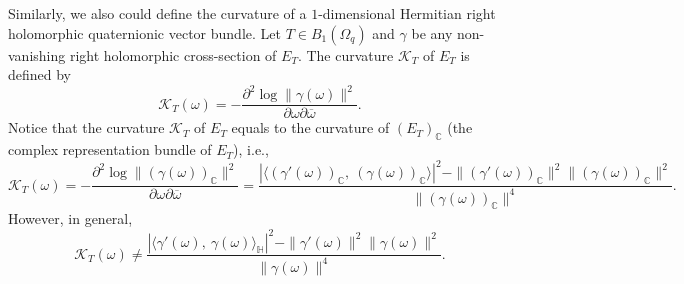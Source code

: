 \documentclass[pdflatex,sn-mathphys-num]{sn-jnl}%
\theoremstyle{thmstyleone}%
\theoremstyle{thmstyletwo}%
\theoremstyle{thmstylethree}%
\theoremstyle{definition}
\theoremstyle{remark}
\begin{document}
Similarly, we also could define the curvature of a $1$-dimensional Hermitian right holomorphic quaternionic vector bundle. Let $T\in B_1(\Omega_q)$ and $\gamma$ be any non-vanishing right holomorphic cross-section of $E_{T}$. The curvature $\mathcal{K}_T$ of $E_T$ is defined by
$$
\mathcal{K}_T(\omega)=-\frac{\partial^2 \log \|\gamma(\omega)\|^2}{\partial\omega\partial\overline{\omega}}.
$$
Notice that the curvature $\mathcal{K}_T$ of $E_T$ equals to the curvature of $(E_T)_{\mathbb{C}}$ (the complex representation bundle of $E_T$), i.e.,
$$
\mathcal{K}_T(\omega)=-\frac{\partial^2 \log \|(\gamma(\omega))_{\mathbb{C}}\|^2}{\partial\omega\partial\overline{\omega}}=\frac{|\langle(\gamma'(\omega))_{\mathbb{C}},\ (\gamma(\omega))_{\mathbb{C}}\rangle|^2-\|(\gamma'(\omega))_{\mathbb{C}}\|^2\|(\gamma(\omega))_{\mathbb{C}}\|^2}{\|(\gamma(\omega))_{\mathbb{C}}\|^4}.
$$
However, in general,
$$
\mathcal{K}_T(\omega)\neq\frac{|\langle\gamma'(\omega),\ \gamma(\omega)\rangle_{\mathbb{H}}|^2-\|\gamma'(\omega)\|^2\|\gamma(\omega)\|^2}{\|\gamma(\omega)\|^4}.
$$
\end{document}
